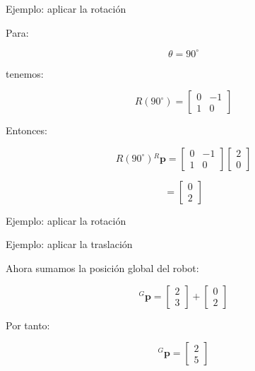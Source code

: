\documentclass[aspectratio=169]{beamer}
\begin{document}
\begin{frame}{Ejemplo: aplicar la rotación}

    Para:

    \[
    \theta=90^\circ
    \]

    tenemos:

    \[
    R(90^\circ)
    =
    \begin{bmatrix}
        0&-1\\
        1&0
    \end{bmatrix}
    \]

    Entonces:

    \[
    R(90^\circ)
    {}^{R}\mathbf{p}
    =
    \begin{bmatrix}
        0&-1\\
        1&0
    \end{bmatrix}
    \begin{bmatrix}
        2\\
        0
    \end{bmatrix}
    \]

    \[
    =
    \begin{bmatrix}
        0\\
        2
    \end{bmatrix}
    \]

\end{frame}

\begin{frame}{Ejemplo: aplicar la rotación}


    \vspace{0.3cm}


\end{frame}

\begin{frame}{Ejemplo: aplicar la traslación}

    Ahora sumamos la posición global del robot:

    \[
    {}^{G}\mathbf{p}
    =
    \begin{bmatrix}
        2\\
        3
    \end{bmatrix}
    +
    \begin{bmatrix}
        0\\
        2
    \end{bmatrix}
    \]

    Por tanto:

    \[
    \boxed{
        {}^{G}\mathbf{p}
        =
        \begin{bmatrix}
            2\\
            5
    \end{bmatrix}}
    \]

\end{frame}
\end{document}
